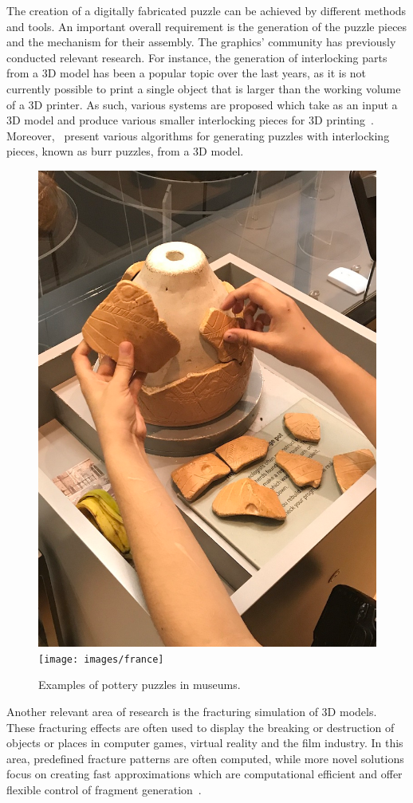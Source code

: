 \documentclass[acmlarge,screen,dvipsnames]{acmart}
\begin{document}
%
The creation of a digitally fabricated puzzle can be achieved by
different methods and tools. An important overall requirement is the
generation of the puzzle pieces and the mechanism for their
assembly. The graphics' community has previously conducted relevant
research. For instance, the generation of interlocking parts from a 3D
model has been a popular topic over the last years, as it is not
currently possible to print a single object that is larger than the
working volume of a 3D printer. As such, various systems are proposed
which take as an input a 3D model and produce various smaller
interlocking pieces for 3D
printing~\cite{Song:2015:POI:2797416.2797510,luo_chopper:_2012,klein_interlocking_2014,skouras_interactive_2015}. Moreover,~\cite{Xin:2011:MBP:2010324.1964992,Song:2012:RIP:2366145.2366147,sun_computational_2015}
present various algorithms for generating puzzles with interlocking
pieces, known as burr puzzles, from a 3D model.
%
\begin{figure}[b]
  \centering
  {\includegraphics[width=0.35\linewidth]{images/uk}}
  \hspace{0.5in}
  {\texttt{[image: images/france]}}
  \caption{\label{fig:puz}Examples of pottery puzzles in museums.}
\end{figure}

Another relevant area of research is the fracturing simulation of 3D
models. These fracturing effects are often used to display the
breaking or destruction of objects or places in computer games,
virtual reality and the film industry. In this area, predefined
fracture patterns are often computed, while more novel solutions focus
on creating fast approximations which are computational efficient and
offer flexible control of fragment
generation~\cite{Schvartzman:2014:FAB:2556700.2556713,Hahn:2016:FAB:2897824.2925902,Zhu:2015:SRB:2809654.2766942,Muller:2013:RTD:2461912.2461934}.
\end{document}
